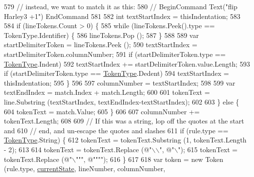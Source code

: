 \begin{DoxyCode}
579                         \textcolor{comment}{// instead, we want to match it as this:}
580                         \textcolor{comment}{//    BeginCommand Text("flip Harley3 +1") EndCommand}
581 
582                         \textcolor{keywordtype}{int} textStartIndex = thisIndentation;
583 
584                         \textcolor{keywordflow}{if} (lineTokens.Count > 0) \{
585                             \textcolor{keywordflow}{while} (lineTokens.Peek().type == TokenType.Identifier) \{
586                                 lineTokens.Pop ();
587                             \}
588 
589                             var startDelimiterToken = lineTokens.Peek ();
590                             textStartIndex = startDelimiterToken.columnNumber;
591                             \textcolor{keywordflow}{if} (startDelimiterToken.type == \hyperlink{a00031_a301aa7c866593a5b625a8fc158bbeace}{TokenType}.Indent)
592                                 textStartIndex += startDelimiterToken.value.Length;
593                             \textcolor{keywordflow}{if} (startDelimiterToken.type == \hyperlink{a00031_a301aa7c866593a5b625a8fc158bbeace}{TokenType}.Dedent)
594                                 textStartIndex = thisIndentation;
595                         \}
596 
597                         columnNumber = textStartIndex;
598 
599                         var textEndIndex = match.Index + match.Length;
600 
601                         tokenText = line.Substring (textStartIndex, textEndIndex-textStartIndex);
602 
603                     \} \textcolor{keywordflow}{else} \{
604                         tokenText = match.Value;
605                     \}
606 
607                     columnNumber += tokenText.Length;
608 
609                     \textcolor{comment}{// If this was a string, lop off the quotes at the start and}
610                     \textcolor{comment}{// end, and un-escape the quotes and slashes}
611                     \textcolor{keywordflow}{if} (rule.type == \hyperlink{a00031_a301aa7c866593a5b625a8fc158bbeace}{TokenType}.String) \{
612                         tokenText = tokenText.Substring (1, tokenText.Length - 2);
613 
614                         tokenText = tokenText.Replace (\textcolor{stringliteral}{@"\(\backslash\)\(\backslash\)"}, \textcolor{stringliteral}{@"\(\backslash\)"});
615                         tokenText = tokenText.Replace (\textcolor{stringliteral}{@"\(\backslash\)"""}, \textcolor{stringliteral}{@""""});
616                     \}
617 
618                     var token = \textcolor{keyword}{new} Token (rule.type, \hyperlink{a00101_ac90b7dce8103425a148f9e8588f14137}{currentState}, lineNumber, columnNumber, 

\end{DoxyCode}
